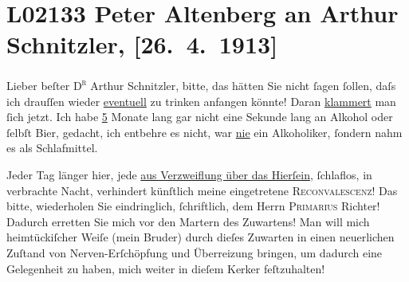 

\section[Peter Altenberg an Arthur Schnitzler, {[}26. 4. 1913{]}]{L02133 Peter Altenberg an Arthur Schnitzler, {[}26. 4. 1913{]}}
\nopagebreak{}
\rehead{ }\normalsize\beginnumbering{}
\toendnotes[C]{\smallbreak\pagebreak[2]}
\toendnotes[C]{\smallbreak}
\toendnotes[C]{\smallbreak}
\pstart{}{\pb}Lieber beſter \textsc{D\textsuperscript{r}} Arthur Schnitzler,\pend\vspace{0.5em}
\pstart
           bitte, das hätten Sie nicht{ }ſagen{ }ſollen, daſs ich drauſſen wieder \uline{eventuell} zu trinken anfangen könnte! Daran \uline{klammert} man{ }ſich jetzt. Ich habe \uline{5} Monate lang gar nicht eine Sekunde lang
               an Alkohol oder{ }ſelbſt Bier, gedacht, ich entbehre es nicht, war \uline{nie} ein Alkoholiker,{ }ſondern nahm es als Schlafmittel.\pend
           
\pstart
           Jeder Tag länger hier, jede \uline{aus Verzweiflung über das
                  Hierſein},{ }ſchlaflos, in 
               verbrachte Nacht, verhindert künſtlich meine eingetretene {\pb}\textsc{Reconvalescenz}! Das bitte, wiederholen Sie eindringlich,{ }ſchriftlich, dem Herrn \textsc{Primarius}{ }Richter! Dadurch erretten Sie mich vor den
               Martern des Zuwartens! Man will mich heimtückiſcher Weiſe (mein Bruder) durch dieſes Zuwarten in einen
               neuerlichen Zuſtand von Nerven-Erſchöpfung und Überreizung bringen, um dadurch eine
                  {\pb}Gelegenheit zu haben, mich weiter in
               dieſem Kerker feſtzuhalten!\pend
           
